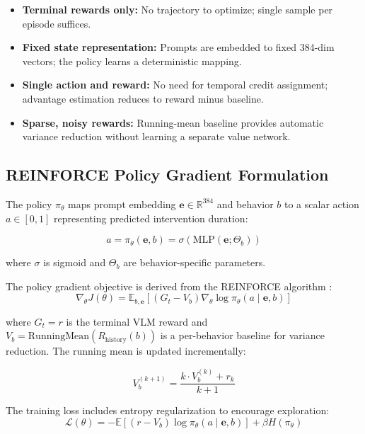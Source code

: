 \documentclass{article}
\begin{document}
\begin{itemize}
\item \textbf{Terminal rewards only:} No trajectory to optimize; single sample per episode suffices.
\item \textbf{Fixed state representation:} Prompts are embedded to fixed 384-dim vectors; the policy learns a deterministic mapping.
\item \textbf{Single action and reward:} No need for temporal credit assignment; advantage estimation reduces to reward minus baseline.
\item \textbf{Sparse, noisy rewards:} Running-mean baseline \cite{williams1992simple} provides automatic variance reduction without learning a separate value network.
\end{itemize}

\subsection{REINFORCE Policy Gradient Formulation}

The policy $\pi_\theta$ maps prompt embedding $\mathbf{e} \in \mathbb{R}^{384}$ and behavior $b$ to a scalar action $a \in [0, 1]$ representing predicted intervention duration:

\begin{equation}
a = \pi_\theta(\mathbf{e}, b) = \sigma(\text{MLP}(\mathbf{e}; \Theta_b))
\end{equation}

where $\sigma$ is sigmoid and $\Theta_b$ are behavior-specific parameters.

The policy gradient objective is derived from the REINFORCE algorithm \cite{williams1992simple}:
\begin{equation}
\nabla_\theta J(\theta) = \mathbb{E}_{b,\mathbf{e}}[(G_t - V_b) \nabla_\theta \log \pi_\theta(a \mid \mathbf{e}, b)]
\end{equation}

where $G_t = r$ is the terminal VLM reward and $V_b = \text{RunningMean}(R_{\text{history}}(b))$ is a per-behavior baseline for variance reduction. The running mean is updated incrementally:

\begin{equation}
V_b^{(k+1)} = \frac{k \cdot V_b^{(k)} + r_k}{k+1}
\end{equation}

The training loss includes entropy regularization to encourage exploration:
\begin{equation}
\mathcal{L}(\theta) = -\mathbb{E}[(r - V_b) \log \pi_\theta(a \mid \mathbf{e}, b)] + \beta H(\pi_\theta)
\end{equation}
\end{document}
